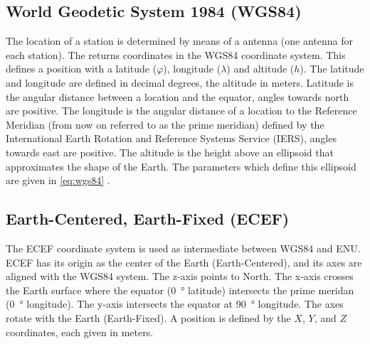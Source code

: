 \subsection{World Geodetic System 1984 (WGS84)}

The location of a \hisparc station is determined by means of a \gps
antenna (one antenna for each station). The \gps returns coordinates in
the WGS84 coordinate system. This defines a position with a latitude
($\varphi$), longitude ($\lambda$) and altitude ($h$). The latitude and
longitude are defined in decimal degrees, the altitude in meters.
Latitude is the angular distance between a location and the equator,
angles towards north are positive. The longitude is the angular distance
of a location to the Reference Meridian (from now on referred to as the
prime meridian) defined by the International Earth Rotation and
Reference Systems Service (IERS), angles towards east are positive. The
altitude is the height above an ellipsoid that approximates the shape of
the Earth. The parameters which define this ellipsoid are given in
\cref{eq:wgs84} \cite{nga:2014aa}.


\subsection{Earth-Centered, Earth-Fixed (ECEF)}

The ECEF coordinate system is used as intermediate between WGS84 and
ENU. ECEF has its origin as the center of the Earth (Earth-Centered),
and its axes are aligned with the WGS84 system. The z-axis points to
North. The x-axis crosses the Earth surface where the equator
(\SI{0}{\degree} latitude) intersects the prime meridan (\SI{0}{\degree}
longitude). The y-axis intersects the equator at \SI{90}{\degree}
longitude. The axes rotate with the Earth (Earth-Fixed). A position is
defined by the $X$, $Y$, and $Z$ coordinates, each given in meters.

